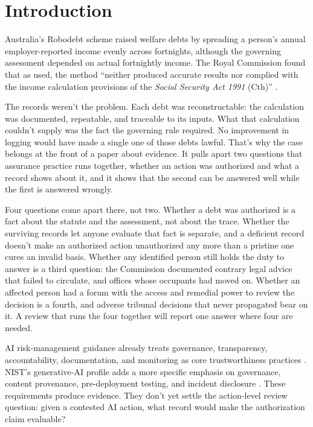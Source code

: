 \section{Introduction}
\label{sec:introduction}

Australia's Robodebt scheme raised welfare debts by spreading a person's annual employer-reported income evenly across fortnights, although the governing assessment depended on actual fortnightly income. The Royal Commission found that as used, the method \enquote{neither produced accurate results nor complied with the income calculation provisions of the \textit{Social Security Act 1991} (Cth)} \citep{robodebtRoyalCommission2023}.

The records weren't the problem. Each debt was reconstructable: the calculation was documented, repeatable, and traceable to its inputs. What that calculation couldn't supply was the fact the governing rule required. No improvement in logging would have made a single one of those debts lawful. That's why the case belongs at the front of a paper about evidence. It pulls apart two questions that assurance practice runs together, whether an action was authorized and what a record shows about it, and it shows that the second can be answered well while the first is answered wrongly.

Four questions come apart there, not two. Whether a debt was authorized is a fact about the statute and the assessment, not about the trace. Whether the surviving records let anyone evaluate that fact is separate, and a deficient record doesn't make an authorized action unauthorized any more than a pristine one cures an invalid basis. Whether any identified person still holds the duty to answer is a third question: the Commission documented contrary legal advice that failed to circulate, and offices whose occupants had moved on. Whether an affected person had a forum with the access and remedial power to review the decision is a fourth, and adverse tribunal decisions that never propagated bear on it. A review that runs the four together will report one answer where four are needed.

AI risk-management guidance already treats governance, transparency, accountability, documentation, and monitoring as core trustworthiness practices \citep{nist2023artificial}. NIST's generative-AI profile adds a more specific emphasis on governance, content provenance, pre-deployment testing, and incident disclosure \citep{nist2024generative}. These requirements produce evidence. They don't yet settle the action-level review question: given a contested AI action, what record would make the authorization claim evaluable?

